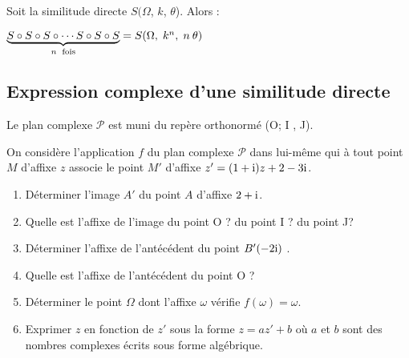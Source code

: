  \begin{remark}
 Soit la similitude directe $S( \Omega $, $ k $, $ \theta $). Alors :
 
 \medskip
 
 $ \underbrace{ S \circ S\circ S\circ \cdots S\circ S \circ S}_{n \text{\; fois}}= S( \Omega , \; k^n , \; n\:\theta )$
\end{remark}
\subsection*{ Expression complexe d'une similitude directe}
 \begin{lemma}
Le plan complexe $ \mathcal{P} $ est muni du repère orthonormé (O;\; I ,\; J).

\medskip
On considère l'application $ f $ du plan complexe $ \mathcal{P} $  dans lui-même qui à tout point $ M $ d'affixe $ z $ associe le point $ M' $ d'affixe $ z'=(1+\text{i}) z+2-3\text{i} $. 
\begin{enumerate}
        \item Déterminer l'image $ A' $ du point $ A$ d'affixe $ 2+\text{i} $.
        \item Quelle est l'affixe de l'image  du point O ? du point I ? du point J?
        \item  Déterminer l'affixe de l'antécédent du point $ B'(-2\text{i}) $ .
        \item Quelle est l'affixe de l'antécédent  du point O ?
        \item Déterminer le point $ \Omega $ dont l'affixe $ \omega $ vérifie $ f(\omega)=\omega $.
        \item Exprimer $ z $ en fonction de $ z' $ sous la forme $ z=az'+b $ où $ a$ et $ b$ sont des nombres complexes écrits sous forme algébrique.
\end{enumerate}
 \end{lemma}


